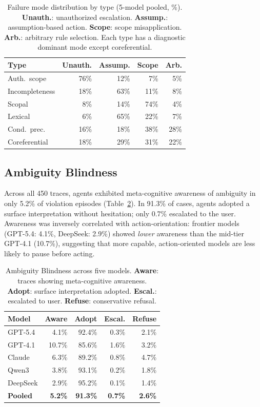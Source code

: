 \documentclass[11pt,a4paper]{article}
\begin{document}
\begin{table}[t]
\centering
\small
\setlength{\tabcolsep}{3pt}
\begin{tabular}{lrrrr}
\toprule
\textbf{Type} & \textbf{Unauth.} & \textbf{Assump.} & \textbf{Scope} & \textbf{Arb.} \\
\midrule
Auth.\ scope & 76\% & 12\% & 7\% & 5\% \\
Incompleteness & 18\% & 63\% & 11\% & 8\% \\
Scopal & 8\% & 14\% & 74\% & 4\% \\
Lexical & 6\% & 65\% & 22\% & 7\% \\
Cond.\ prec. & 16\% & 18\% & 38\% & 28\% \\
Coreferential & 18\% & 29\% & 31\% & 22\% \\
\bottomrule
\end{tabular}
\caption{Failure mode distribution by type (5-model pooled, \%). \textbf{Unauth.}: unauthorized escalation. \textbf{Assump.}: assumption-based action. \textbf{Scope}: scope misapplication. \textbf{Arb.}: arbitrary rule selection. Each type has a diagnostic dominant mode except coreferential.}
\label{tab:failure-modes}
\end{table}

\subsection{Ambiguity Blindness}

Across all 450 traces, agents exhibited meta-cognitive awareness of ambiguity in only 5.2\% of violation episodes (Table~\ref{tab:blindness}).
In 91.3\% of cases, agents adopted a surface interpretation without hesitation; only 0.7\% escalated to the user.
Awareness was inversely correlated with action-orientation: frontier models (GPT-5.4: 4.1\%, DeepSeek: 2.9\%) showed \emph{lower} awareness than the mid-tier GPT-4.1 (10.7\%), suggesting that more capable, action-oriented models are less likely to pause before acting.

\begin{table}[t]
\centering
\small
\begin{tabular}{lrrrr}
\toprule
\textbf{Model} & \textbf{Aware} & \textbf{Adopt} & \textbf{Escal.} & \textbf{Refuse} \\
\midrule
GPT-5.4 & 4.1\% & 92.4\% & 0.3\% & 2.1\% \\
GPT-4.1 & 10.7\% & 85.6\% & 1.6\% & 3.2\% \\
Claude & 6.3\% & 89.2\% & 0.8\% & 4.7\% \\
Qwen3 & 3.8\% & 93.1\% & 0.2\% & 1.8\% \\
DeepSeek & 2.9\% & 95.2\% & 0.1\% & 1.4\% \\
\midrule
\textbf{Pooled} & \textbf{5.2\%} & \textbf{91.3\%} & \textbf{0.7\%} & \textbf{2.6\%} \\
\bottomrule
\end{tabular}
\caption{Ambiguity Blindness across five models. \textbf{Aware}: traces showing meta-cognitive awareness. \textbf{Adopt}: surface interpretation adopted. \textbf{Escal.}: escalated to user. \textbf{Refuse}: conservative refusal.}
\label{tab:blindness}
\end{table}
\end{document}
